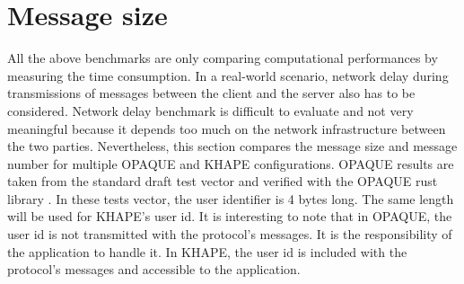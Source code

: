 ﻿\documentclass[../report.tex]{subfiles}
\begin{document}



\section{Message size} \label{sec:comp_message_size}
All the above benchmarks are only comparing computational performances by measuring the time consumption. In a real-world scenario, network delay during transmissions of messages between the client and the server also has to be considered. Network delay benchmark is difficult to evaluate and not very meaningful because it depends too much on the network infrastructure between the two parties.
Nevertheless, this section compares the message size and message number for multiple OPAQUE and KHAPE configurations.
OPAQUE results are taken from the standard draft test vector and verified with the OPAQUE rust library \cite{OPAQUE_KE_lib}. In these tests vector, the user identifier is 4 bytes long. The same length will be used for KHAPE's user id. It is interesting to note that in OPAQUE, the user id is not transmitted with the protocol's messages. It is the responsibility of the application to handle it. In KHAPE, the user id is included with the protocol's messages and accessible to the application.
\end{document}
